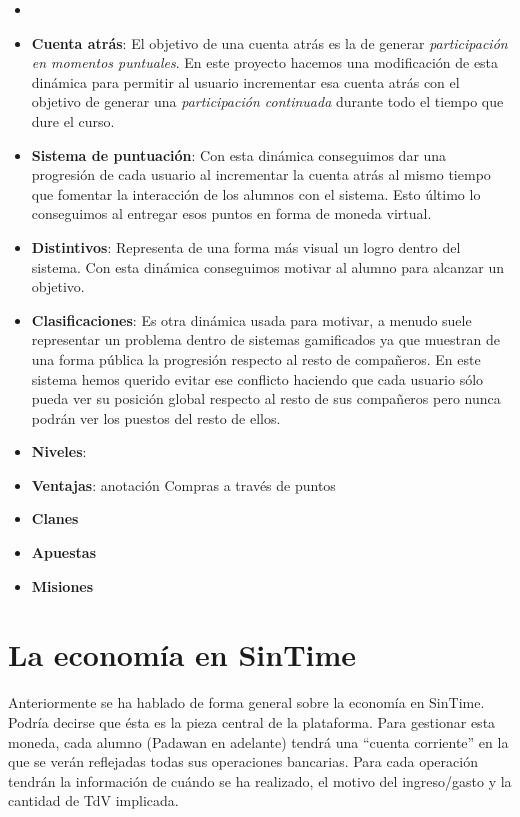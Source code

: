 \begin{itemize}
	\item \textbf{}
	
	\item \textbf{Cuenta atrás}: El objetivo de una cuenta atrás es la de generar \textit{participación en momentos puntuales}. En este proyecto hacemos una modificación de esta dinámica para permitir al usuario incrementar esa cuenta atrás con el objetivo de generar una \textit{participación continuada} durante todo el tiempo que dure el curso.
	\item \textbf{Sistema de puntuación}: Con esta dinámica conseguimos dar una progresión de cada usuario al incrementar la cuenta atrás al mismo tiempo que fomentar la interacción de los alumnos con el sistema. Esto último lo conseguimos al entregar esos puntos en forma de moneda virtual. 
	\item \textbf{Distintivos}: Representa de una forma más visual un logro dentro del sistema. Con esta dinámica conseguimos motivar al alumno para alcanzar un objetivo.
	\item \textbf{Clasificaciones}: Es otra dinámica usada para motivar, a menudo suele representar un problema dentro de sistemas gamificados ya que muestran de una forma pública la progresión respecto al resto de compañeros. En este sistema hemos querido evitar ese conflicto haciendo que cada usuario sólo pueda ver su posición global respecto al resto de sus compañeros pero nunca podrán ver los puestos del resto de ellos.
	\item \textbf{Niveles}: 
	\item \textbf{Ventajas}: anotación Compras a través de puntos
	\item \textbf{Clanes}
	\item \textbf{Apuestas}
	\item \textbf{Misiones}
\end{itemize}

\section{La economía en SinTime}
Anteriormente se ha hablado de forma general sobre la economía en SinTime. Podría decirse que ésta es la pieza central de la plataforma. Para gestionar esta moneda, cada alumno (Padawan en adelante) tendrá una ``cuenta corriente'' en la que se verán reflejadas todas sus operaciones bancarias. Para cada operación tendrán la información de cuándo se ha realizado, el motivo del ingreso/gasto y la cantidad de TdV implicada.\\


